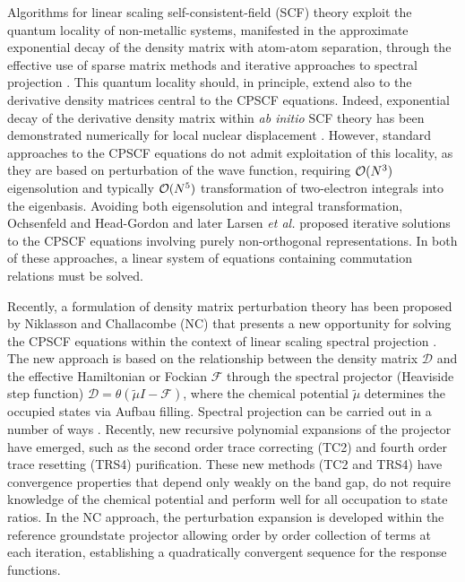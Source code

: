 \documentclass[prl,aps,preprint,showpacs,superbib]{revtex4}
\begin{document}
Algorithms for linear scaling self-consistent-field (SCF) theory exploit the quantum locality
of non-metallic systems, manifested in the approximate exponential decay of the density matrix 
with atom-atom separation, through the effective use of sparse matrix methods and iterative 
approaches to spectral projection \cite{ANiklasson02A,ANiklasson03}.  This quantum locality should,  in principle, extend also to 
the derivative density matrices central to the CPSCF equations.  Indeed,  
exponential decay of the derivative density matrix within {\em ab initio} SCF theory has been demonstrated 
numerically for local nuclear displacement \cite{Ochsenfeld_1997}. However, standard approaches to the CPSCF equations 
\cite{StandardCPSCF}
do not admit exploitation of this locality, as they are based 
on perturbation of the wave function, requiring ${\cal O}(N^3)$ eigensolution and typically ${\cal O}(N^5)$ 
transformation of two-electron integrals into the eigenbasis.   Avoiding both 
eigensolution and integral transformation,  Ochsenfeld and Head-Gordon \cite{Ochsenfeld_1997} and
later Larsen {\em et al.} \cite{Helgaker_2001} proposed iterative solutions to the CPSCF equations 
involving purely non-orthogonal representations.   In both of these approaches, a 
linear system of equations containing commutation relations must be solved.

Recently, a formulation of density matrix perturbation theory has been proposed 
by Niklasson and Challacombe (NC) \cite{ANiklasson04} that presents a new opportunity for solving 
the CPSCF equations within the context of linear scaling spectral projection \cite{ANiklasson02A,ANiklasson03}.  
The new approach is based on the relationship between the density matrix $\mathcal{D}$ and the effective Hamiltonian 
or Fockian $\mathcal{F}$ through the spectral projector (Heaviside step function) $\mathcal{D}=\theta(\tilde{\mu}I-\mathcal{F})$, 
where the chemical potential $\tilde{\mu}$ determines the occupied states via Aufbau filling.   
Spectral projection can be carried out in a number of ways 
\cite{ANiklasson02A,ANiklasson03,Projection}.
Recently, new recursive polynomial expansions of the projector have emerged, 
such as the second order trace correcting (TC2) \cite{ANiklasson02A} and fourth order trace resetting 
(TRS4) \cite{ANiklasson03} purification.  These new methods (TC2 and TRS4) have convergence properties 
that depend only weakly on the band gap, do not require knowledge of the chemical potential
and perform well for all occupation to state ratios. In the NC approach, 
the perturbation expansion is developed within the reference groundstate projector allowing 
order by order collection of terms at each iteration, establishing a quadratically convergent 
sequence for the response functions.  
\end{document}
